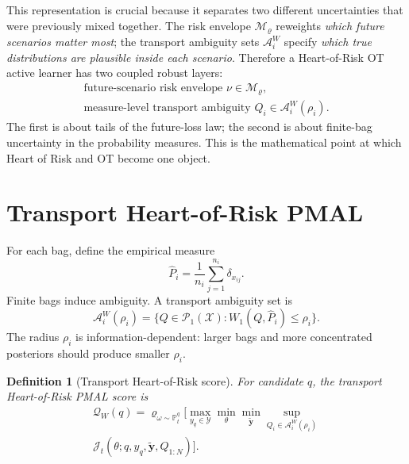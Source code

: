 \documentclass[10pt,journal]{IEEEtran}
\newtheorem{definition}{Definition}
\newcommand{\Prob}{\mathbb{P}}
\newcommand{\Pcal}{\mathcal{P}}
\newcommand{\Xcal}{\mathcal{X}}
\newcommand{\Ycal}{\mathcal{Y}}
\newcommand{\Jcal}{\mathcal{J}}
\newcommand{\Mcal}{\mathcal{M}}
\newcommand{\risk}{\varrho}
\newcommand{\Qcal}{\mathcal{Q}}
\newcommand{\Acal}{\mathcal{A}}
\begin{document}
This representation is crucial because it separates two different uncertainties that were previously mixed together. The risk envelope $\Mcal_\risk$ reweights \emph{which future scenarios matter most}; the transport ambiguity sets $\Acal_i^W$ specify \emph{which true distributions are plausible inside each scenario}. Therefore a Heart-of-Risk OT active learner has two coupled robust layers:
\begin{equation}
\label{eq:two-robust-layers}
\begin{array}{c}
\text{future-scenario risk envelope } \nu\in\Mcal_\risk,\\[0.2em]
\text{measure-level transport ambiguity } Q_i\in\Acal_i^W(\rho_i).
\end{array}
\end{equation}
The first is about tails of the future-loss law; the second is about finite-bag uncertainty in the probability measures. This is the mathematical point at which Heart of Risk and OT become one object.

\section{Transport Heart-of-Risk PMAL}
\label{sec:transport-heart-pmal}

For each bag, define the empirical measure
\begin{equation}
    \widehat P_i=\frac{1}{n_i}\sum_{j=1}^{n_i}\delta_{x_{ij}}.
\end{equation}
Finite bags induce ambiguity. A transport ambiguity set is
\begin{equation}
\label{eq:wasserstein-ball-v5}
    \Acal_i^W(\rho_i)=\{Q\in\Pcal_1(\Xcal):W_1(Q,\widehat P_i)\le \rho_i\}.
\end{equation}
The radius $\rho_i$ is information-dependent: larger bags and more concentrated posteriors should produce smaller $\rho_i$.

\begin{definition}[Transport Heart-of-Risk score]
\label{def:transport-heart-score}
For candidate $q$, the transport Heart-of-Risk PMAL score is
\begin{multline}
\label{eq:transport-heart-score}
\Qcal_W(q)=\risk_{\omega\sim\Prob_t^q}\Bigg[
\max_{y_q\in\Ycal}\min_\theta\min_{\tilde{\mathbf y}}
\sup_{Q_i\in\Acal_i^W(\rho_i)} \\[-0.2em]
\Jcal_t(\theta;q,y_q,\tilde{\mathbf y},Q_{1:N})\Bigg].
\end{multline}
\end{definition}
\end{document}
